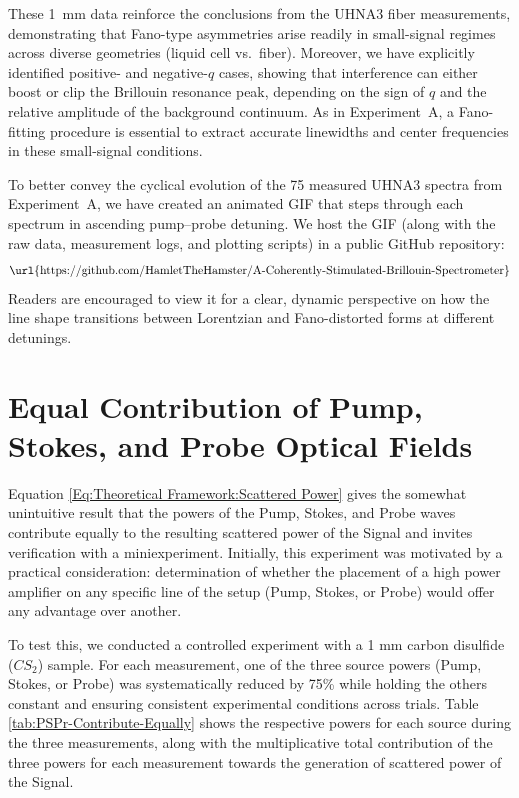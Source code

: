 \FloatBarrier

These \SI{1}{\milli\meter}  data reinforce the conclusions from the UHNA3 fiber measurements, demonstrating that Fano-type asymmetries arise readily in small-signal regimes across diverse geometries (liquid cell vs.\ fiber). Moreover, we have explicitly identified positive- and negative-\(q\) cases, showing that interference can either boost or clip the Brillouin resonance peak, depending on the sign of \(q\) and the relative amplitude of the background continuum. As in Experiment~A, a Fano-fitting procedure is essential to extract accurate linewidths and center frequencies in these small-signal conditions.

\vspace{2em}

To better convey the cyclical evolution of the 75 measured UHNA3 spectra from Experiment~A, we have created an animated GIF that steps through each spectrum in ascending pump--probe detuning. We host the GIF (along with the raw data, measurement logs, and plotting scripts) in a public GitHub repository:
\[
\text{\url{https://github.com/HamletTheHamster/A-Coherently-Stimulated-Brillouin-Spectrometer}}
\]
Readers are encouraged to view it for a clear, dynamic perspective on how the line shape transitions between Lorentzian and Fano-distorted forms at different detunings.

\newpage


\section{Equal Contribution of Pump, Stokes, and Probe Optical Fields}

Equation \ref{Eq:Theoretical Framework:Scattered Power} gives the somewhat unintuitive result that the powers of the Pump, Stokes, and Probe waves contribute equally to the resulting scattered power of the Signal and invites verification with a miniexperiment. Initially, this experiment was motivated by a practical consideration: determination of whether the placement of a high power amplifier on any specific line of the setup (Pump, Stokes, or Probe) would offer any advantage over another.

To test this, we conducted a controlled experiment with a 1 mm carbon disulfide ($CS_{2}$) sample. For each measurement, one of the three source powers (Pump, Stokes, or Probe) was systematically reduced by 75\% while holding the others constant and ensuring consistent experimental conditions across trials. Table \ref{tab:PSPr-Contribute-Equally} shows the respective powers for each source during the three measurements, along with the multiplicative total contribution of the three powers for each measurement towards the generation of scattered power of the Signal.

